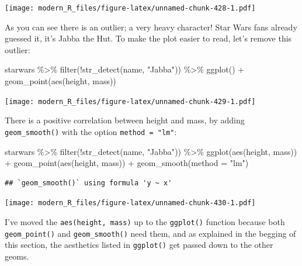\documentclass[
]{article}
\newenvironment{Shaded}{\begin{snugshade}}{\end{snugshade}}
\newcommand{\AttributeTok}[1]{\textcolor[rgb]{0.77,0.63,0.00}{#1}}
\newcommand{\FunctionTok}[1]{\textcolor[rgb]{0.00,0.00,0.00}{#1}}
\newcommand{\NormalTok}[1]{#1}
\newcommand{\SpecialCharTok}[1]{\textcolor[rgb]{0.00,0.00,0.00}{#1}}
\newcommand{\StringTok}[1]{\textcolor[rgb]{0.31,0.60,0.02}{#1}}
\begin{document}
\texttt{[image: modern\_R\_files/figure-latex/unnamed-chunk-428-1.pdf]}

As you can see there is an outlier; a very heavy character! Star Wars fans already guessed it, it's Jabba the Hut.
To make the plot easier to read, let's remove this outlier:

\begin{Shaded}
\begin{Highlighting}[]
\NormalTok{starwars }\SpecialCharTok{\%\textgreater{}\%}
  \FunctionTok{filter}\NormalTok{(}\SpecialCharTok{!}\FunctionTok{str\_detect}\NormalTok{(name, }\StringTok{"Jabba"}\NormalTok{)) }\SpecialCharTok{\%\textgreater{}\%}
  \FunctionTok{ggplot}\NormalTok{() }\SpecialCharTok{+}
    \FunctionTok{geom\_point}\NormalTok{(}\FunctionTok{aes}\NormalTok{(height, mass))}
\end{Highlighting}
\end{Shaded}

\texttt{[image: modern\_R\_files/figure-latex/unnamed-chunk-429-1.pdf]}

There is a positive correlation between height and mass, by adding \texttt{geom\_smooth()} with the option \texttt{method\ =\ "lm"}:

\begin{Shaded}
\begin{Highlighting}[]
\NormalTok{starwars }\SpecialCharTok{\%\textgreater{}\%}
  \FunctionTok{filter}\NormalTok{(}\SpecialCharTok{!}\FunctionTok{str\_detect}\NormalTok{(name, }\StringTok{"Jabba"}\NormalTok{)) }\SpecialCharTok{\%\textgreater{}\%}
  \FunctionTok{ggplot}\NormalTok{(}\FunctionTok{aes}\NormalTok{(height, mass)) }\SpecialCharTok{+}
  \FunctionTok{geom\_point}\NormalTok{(}\FunctionTok{aes}\NormalTok{(height, mass)) }\SpecialCharTok{+}
  \FunctionTok{geom\_smooth}\NormalTok{(}\AttributeTok{method =} \StringTok{"lm"}\NormalTok{)}
\end{Highlighting}
\end{Shaded}

\begin{verbatim}
## `geom_smooth()` using formula 'y ~ x'
\end{verbatim}

\texttt{[image: modern\_R\_files/figure-latex/unnamed-chunk-430-1.pdf]}

I've moved the \texttt{aes(height,\ mass)} up to the \texttt{ggplot()} function because both \texttt{geom\_point()} and \texttt{geom\_smooth()}
need them, and as explained in the begging of this section, the aesthetics listed in \texttt{ggplot()} get passed down
to the other geoms.
\end{document}
